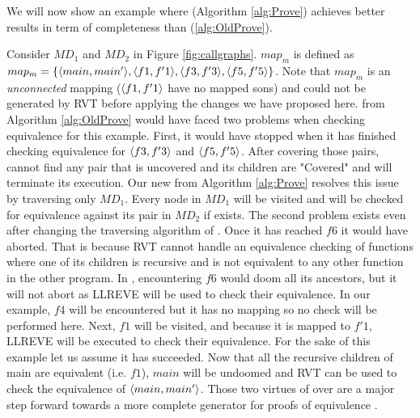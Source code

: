 We will now show an example where  (Algorithm \ref{alg:Prove}) achieves better results in term of completeness than  (\ref{alg:OldProve}). 
\begin{example}
Consider $MD_1$ and $MD_2$ in Figure \ref{fig:callgraphs}. $map_m$ is defined as $map_m = \{ \langle main,main'\rangle,\langle f1,f'1\rangle, \langle f3,f'3\rangle,\langle f5,f'5\rangle\}$. Note that $map_m$ is an \emph{unconnected} mapping ($\langle f1,f'1\rangle$ have no mapped sons) and could not be generated by RVT before applying the changes we have proposed here.  from Algorithm \ref{alg:OldProve} would have faced two problems when checking equivalence for this example. First, it would have stopped when it has finished checking equivalence for $\langle f3,f'3\rangle$ and $\langle f5,f'5\rangle$. After covering those pairs,  cannot find any pair that is uncovered and its children are "Covered" and will terminate its execution. Our new  from Algorithm \ref{alg:Prove} resolves this issue by traversing only $MD_1$. Every node in $MD_1$ will be visited and will be checked for equivalence against its pair in $MD_2$ if exists. The second problem exists even after changing the traversing algorithm of . Once it has reached $f6$ it would have aborted. That is because RVT cannot handle an equivalence checking of functions where one of its children is recursive and is not equivalent to any other function in the other program. In , encountering $f6$ would doom all its ancestors, but it will not abort as LLREVE will be used to check their equivalence. In our example, $f4$ will be encountered but it has no mapping so no check will be performed here. Next, $f1$ will be visited, and because it is mapped to $f'1$, LLREVE will be executed to check their equivalence. For the sake of this example let us assume it has succeeded. Now that all the recursive children of main are equivalent (i.e. $f1$), $main$ will be undoomed and RVT can be used to check the equivalence of $\langle main,main'\rangle$. Those two virtues of  over  are a major step forward towards a more complete generator for proofs of equivalence .
\end{example}